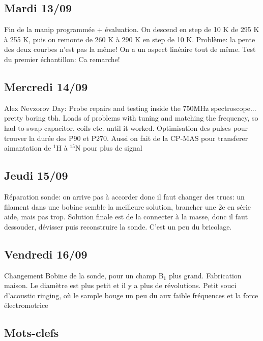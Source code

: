 \documentclass{article}
\begin{document}
\subsection{Mardi 13/09}
Fin de la manip programmée + évaluation. On descend en step de 10 K de 295 K à 255 K, puis on remonte de 260 K à 290 K en step de 10 K. Problème: la pente des deux courbes n'est pas la même! On a un aspect linéaire tout de même.
Test du premier échantillon: Ca remarche!

\subsection{Mercredi 14/09}

Alex Nevzorov Day: Probe repairs and testing inside the 750MHz spectroscope... pretty boring tbh. Loads of problems with tuning and matching the frequency, so had to swap capacitor, coils etc. until it worked. Optimisation des pulses pour trouver la durée des P90 et P270. Aussi on fait de la CP-MAS pour transferer aimantation de $^1$H à $^{15}$N pour plus de signal

\subsection{Jeudi 15/09}
Réparation sonde: on arrive pas à accorder donc il faut changer des trucs: un filament dans une bobine semble la meilleure solution, brancher une 2e en série aide, mais pas trop. Solution finale est de la connecter à la masse, donc il faut dessouder, dévisser puis reconstruire la sonde. C'est un peu du bricolage.

\subsection{Vendredi 16/09}
Changement Bobine de la sonde, pour un champ B$_1$ plus grand. Fabrication maison. Le diamètre est plus petit et il y a plus de révolutions. Petit souci d'acoustic ringing, où le sample bouge un peu du aux faible fréquences et la force électromotrice

\subsection{Mots-clefs}
\end{document}
